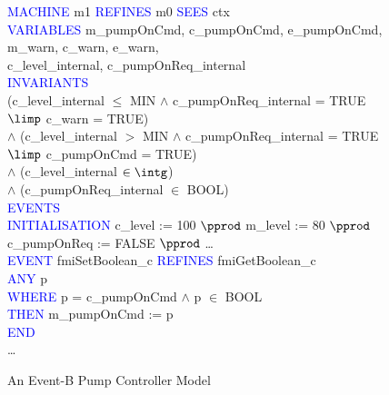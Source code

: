 \documentclass{llncs}%
\begin{document}
\begin{figure}
\centering
\begin{minipage}{0.95\textwidth}
\textcolor{blue}{MACHINE} m1 \textcolor{blue}{REFINES} m0 \textcolor{blue}{SEES} ctx \\
\textcolor{blue}{VARIABLES}  \hspace*{0.2cm} m\_pumpOnCmd, c\_pumpOnCmd, e\_pumpOnCmd, m\_warn, c\_warn, e\_warn,\\
\hspace*{0.2cm} c\_level\_internal, c\_pumpOnReq\_internal\\
\textcolor{blue}{INVARIANTS}\\
\hspace*{0.2cm}(c\_level\_internal $\leq$ MIN $\land$  c\_pumpOnReq\_internal = TRUE $\limp$  c\_warn = TRUE)\\
\hspace*{0.2cm} $\land$ (c\_level\_internal $>$  MIN $\land$  c\_pumpOnReq\_internal = TRUE\\
\hspace*{0.5cm} $\limp$  c\_pumpOnCmd = TRUE)\\
\hspace*{0.2cm} $\land$ (c\_level\_internal $\in  \intg$)\\
\hspace*{0.2cm} $\land$ (c\_pumpOnReq\_internal $\in$  BOOL)\\
\textcolor{blue}{EVENTS}\\
\textcolor{blue}{INITIALISATION} c\_level :=  100 $\pprod$ m\_level := 80 $\pprod$ c\_pumpOnReq :=  FALSE $\pprod$ \ldots\\
\textcolor{blue}{EVENT} fmiSetBoolean\_c \textcolor{blue}{REFINES} fmiGetBoolean\_c\\
\hspace*{0.2cm}\textcolor{blue}{ANY} p\\
\hspace*{0.2cm}\textcolor{blue}{WHERE} p = c\_pumpOnCmd $\land$ p $\in$ BOOL  \\
\hspace*{0.2cm}\textcolor{blue}{THEN} m\_pumpOnCmd :=  p\\
\hspace*{0.2cm}\textcolor{blue}{END}\\
\ldots
\end{minipage}
\caption{An Event-B  Pump Controller Model}
\label{fig:controllerSpec2}
\end{figure}
%
%
\end{document}
